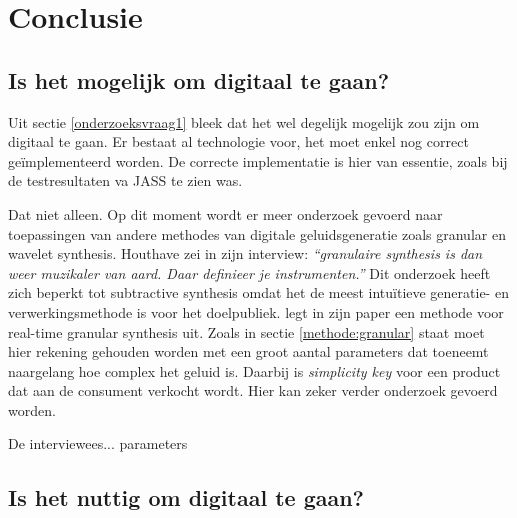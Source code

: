 
\chapter{Conclusie}
\label{ch:conclusie}


\section{Is het mogelijk om digitaal te gaan?}

Uit sectie \ref{onderzoeksvraag1} bleek dat het wel degelijk mogelijk zou zijn om digitaal te gaan. Er bestaat al technologie voor, het moet enkel nog correct geïmplementeerd worden. De correcte implementatie is hier van essentie, zoals bij de testresultaten va JASS te zien was.

Dat niet alleen. Op dit moment wordt er meer onderzoek gevoerd naar toepassingen van andere methodes van digitale geluidsgeneratie zoals granular en wavelet synthesis. Houthave zei in zijn interview: \textit{``granulaire synthesis is dan weer muzikaler van aard. Daar definieer je instrumenten.''} \autocite{thomashouthave} Dit onderzoek heeft zich beperkt tot subtractive synthesis omdat het de meest intuïtieve generatie- en verwerkingsmethode is voor het doelpubliek. \textcite{granular} legt in zijn paper een methode voor real-time granular synthesis uit. Zoals in sectie \ref{methode:granular} staat moet hier rekening gehouden worden met een groot aantal parameters dat toeneemt naargelang hoe complex het geluid is. Daarbij is \textit{simplicity key} voor een product dat aan de consument verkocht wordt. Hier kan zeker verder onderzoek gevoerd worden.

De interviewees... parameters

\section{Is het nuttig om digitaal te gaan?}

